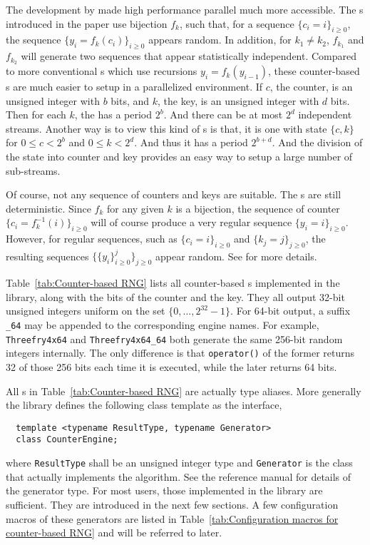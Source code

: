 The development by \textcite{Salmon:2011um} made high performance parallel \rng
much more accessible. The \rng{}s introduced in the paper use bijection $f_k$,
such that, for a sequence $\{c_i = i\}_{i\ge0}$, the sequence $\{y_i =
f_k(c_i)\}_{i\ge0}$ appears random. In addition, for $k_1 \ne k_2$, $f_{k_1}$
and $f_{k_2}$ will generate two sequences that appear statistically
independent. Compared to more conventional \rng{}s which use recursions $y_i =
f_k(y_{i - 1})$, these counter-based \rng{}s are much easier to setup in a
parallelized environment. If $c$, the counter, is an unsigned integer with $b$
bits, and $k$, the key, is an unsigned integer with $d$ bits. Then for each
$k$, the \rng has a period $2^b$. And there can be at most $2^d$ independent
streams. Another way is to view this kind of \rng{}s is that, it is one \rng{}
with state $\{c, k\}$ for $0 \le c < 2^b$ and $0 \le k < 2^d$. And thus it has
a period $2^{b + d}$. And the division of the state into counter and key
provides an easy way to setup a large number of sub-streams.

Of course, not any sequence of counters and keys are suitable. The \rng{}s are
still deterministic. Since $f_k$ for any given $k$ is a bijection, the sequence
of counter $\{c_i = f_k^{-1}(i)\}_{i\ge0}$ will of course produce a very
regular sequence $\{y_i = i\}_{i\ge0}$. However, for regular sequences, such
as $\{c_i = i\}_{i\ge0}$ and $\{k_j = j\}_{j\ge0}$, the resulting sequences
$\{\{y_i\}_{i\ge0}^j\}_{j\ge0}$ appear random. See \textcite{Salmon:2011um} for
more details.

Table~\ref{tab:Counter-based RNG} lists all counter-based \rng{}s implemented
in the library, along with the bits of the counter and the key. They all output
32-bit unsigned integers uniform on the set $\{0,\dots,2^{32}-1\}$. For 64-bit
output, a suffix \verb|_64| may be appended to the corresponding \rng engine
names. For example, \verb|Threefry4x64| and \verb|Threefry4x64_64| both
generate the same 256-bit random integers internally. The only difference is
that \verb|operator()| of the former returns 32 of those 256 bits each time it
is executed, while the later returns 64 bits.

All \rng{}s in Table~\ref{tab:Counter-based RNG} are actually type aliases.
More generally the library defines the following class template as the
interface,
\begin{Verbatim}
  template <typename ResultType, typename Generator>
  class CounterEngine;
\end{Verbatim}
where \verb|ResultType| shall be an unsigned integer type and \verb|Generator|
is the class that actually implements the algorithm. See the reference manual
for details of the generator type. For most users, those implemented in the
library are sufficient. They are introduced in the next few sections. A few
configuration macros of these generators are listed in
Table~\ref{tab:Configuration macros for counter-based RNG} and will be referred
to later.

